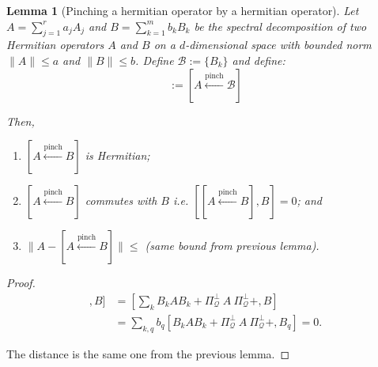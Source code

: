 \documentclass[12pt]{article}
\theoremstyle{plain}
\newtheorem{lemma}[theorem]{Lemma}
\begin{document}
\begin{lemma}[Pinching a hermitian operator by a hermitian operator]
Let $A = \sum\limits_{j = 1}^r a_j A_j$ and $B = \sum\limits_{k = 1}^m b_k B_k$ be the spectral decomposition of two Hermitian operators $A$ and $B$ on a $d$-dimensional space with bounded norm $\|A\| \leq a$ and $\|B\| \leq b$. Define $\mathcal{B} := \{B_k\}$ and define:
\begin{equation}
    [A \overset{\text{pinch}}{\gets} B] :=  [A \overset{\text{pinch}}{\gets} \mathcal{B}]
\end{equation}

\noindent Then,
\begin{enumerate}
    \item $[A \overset{\text{pinch}}{\gets} B]$ is Hermitian;
    \item $[A \overset{\text{pinch}}{\gets} B]$ commutes with $B$ i.e. $[[A \overset{\text{pinch}}{\gets} B], B] = 0$; and
    \item $\| A - [A \overset{\text{pinch}}{\gets} B] \| \leq$ (same bound from previous lemma).
\end{enumerate}
\end{lemma}

\begin{proof}

\begin{align*}
     [[A \overset{\text{pinch}}{\gets} B], B] &= \left[\sum\limits_{k} B_k A B_k + \Pi_{\mathcal{Q}}^\bot \ A\ \Pi_{\mathcal{Q}}^\bot + , B\right]\\
     &= \sum\limits_{k, q} b_q\left[B_k A B_k + \Pi_{\mathcal{Q}}^\bot \ A\ \Pi_{\mathcal{Q}}^\bot + , B_q\right] = 0.
\end{align*}

The distance is the same one from the previous lemma.

\end{proof}
\end{document}
